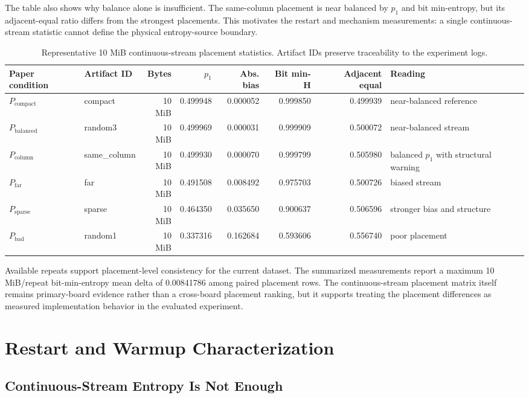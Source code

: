 \documentclass[journal]{IEEEtran}
\newcommand{\pbad}{$P_\mathrm{bad}$}
\newcommand{\pbal}{$P_\mathrm{balanced}$}
\newcommand{\pcompact}{$P_\mathrm{compact}$}
\newcommand{\pcolumn}{$P_\mathrm{column}$}
\newcommand{\pfar}{$P_\mathrm{far}$}
\newcommand{\psparse}{$P_\mathrm{sparse}$}
\begin{document}
The table also shows why balance alone is insufficient. The same-column placement is near balanced by $p_1$ and bit min-entropy, but its adjacent-equal ratio differs from the strongest placements. This motivates the restart and mechanism measurements: a single continuous-stream statistic cannot define the physical entropy-source boundary.

\begin{table}[t]
\centering
\caption{Representative 10 MiB continuous-stream placement statistics. Artifact IDs preserve traceability to the experiment logs.}
\label{tab:placement}
\scriptsize
\begin{tabular}{llrrrrrl}
\toprule
Paper condition & Artifact ID & Bytes & $p_1$ & Abs. bias & Bit min-H & Adjacent equal & Reading \\
\midrule
\pcompact{} & compact & 10 MiB & 0.499948 & 0.000052 & 0.999850 & 0.499939 & near-balanced reference \\
\pbal{} & random3 & 10 MiB & 0.499969 & 0.000031 & 0.999909 & 0.500072 & near-balanced stream \\
\pcolumn{} & same\_column & 10 MiB & 0.499930 & 0.000070 & 0.999799 & 0.505980 & balanced $p_1$ with structural warning \\
\pfar{} & far & 10 MiB & 0.491508 & 0.008492 & 0.975703 & 0.500726 & biased stream \\
\psparse{} & sparse & 10 MiB & 0.464350 & 0.035650 & 0.900637 & 0.506596 & stronger bias and structure \\
\pbad{} & random1 & 10 MiB & 0.337316 & 0.162684 & 0.593606 & 0.556740 & poor placement \\
\bottomrule
\end{tabular}
\end{table}

Available repeats support placement-level consistency for the current dataset. The summarized measurements report a maximum 10 MiB/repeat bit-min-entropy mean delta of 0.00841786 among paired placement rows. The continuous-stream placement matrix itself remains primary-board evidence rather than a cross-board placement ranking, but it supports treating the placement differences as measured implementation behavior in the evaluated experiment.

\section{Restart and Warmup Characterization}

\subsection{Continuous-Stream Entropy Is Not Enough}
\end{document}

